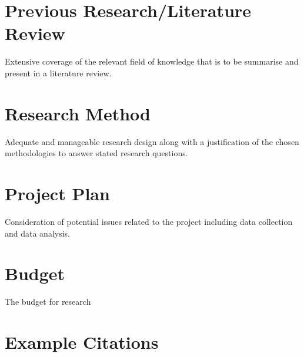 \documentclass[10pt,a4paper]{article}
\begin{document}
\section{Previous Research/Literature Review}
\begin{center}
	Extensive coverage of the relevant field of knowledge that is to be summarise and present in a literature review.
\end{center}


\section{Research Method}
\begin{center}
	Adequate and manageable research design along with a justification of the chosen methodologies to answer stated research questions.
\end{center}


\section{Project Plan}
\begin{center}
	Consideration of potential issues related to the project including data collection and data analysis.
\end{center}


\section{Budget}
The budget for research

\section{Example Citations}
\cite{novak indirect reciprocity}
\cite{leading eight}
\cite{leading eight,novak indirect reciprocity,social norms small scale society}

\pagebreak
\end{document}
